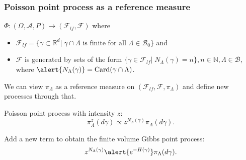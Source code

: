 \documentclass[c, 10pt]{beamer}
\begin{document}
\begin{frame}\frametitle{Poisson point process as a reference measure}
$\Phi: (\Omega, \mathcal A, P) \to (\mathcal F_{lf}, \mathscr F)$ where 
\begin{itemize}
\item $\mathcal F_{lf} = \{ \gamma \subset \mathbb R^d | \; \gamma \cap \Lambda \text{ is finite for all } \Lambda \in \mathcal B_0\}$ and 
\item $\mathscr F$ is generated by sets of the form $\{\gamma \in \mathcal F_{lf} | \; N_\Lambda(\gamma) = n \}, n \in \mathbb N, \Lambda \in \mathcal B$, where $\alert{N_\Lambda(\gamma)} = \text{Card}(\gamma \cap \Lambda)$.
\end{itemize}
\vspace{3mm}
\pause
We can view $\pi_\Lambda$ as a reference measure on $(\mathcal F_{lf}, \mathscr F, \pi_\Lambda)$ and define new processes through that.

\vspace{2mm}
Poisson point process with intensity $z$:
$$ \pi^z_\Lambda (d\gamma) \propto z^{N_\Lambda(\gamma)} \pi_\Lambda(d\gamma).$$

\pause

Add a new term to obtain the finite volume Gibbs point process:
$$ z^{N_\Lambda(\gamma)} \alert{ e^{- H(\gamma)} } \pi_\Lambda(d\gamma)  .$$

\end{frame}
\end{document}
